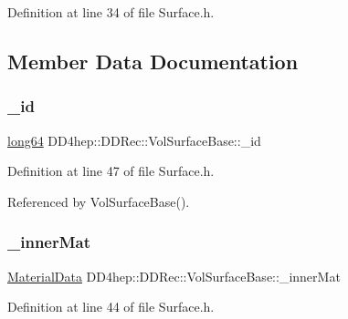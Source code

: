 Definition at line 34 of file Surface.\+h.



\subsection{Member Data Documentation}
\hypertarget{class_d_d4hep_1_1_d_d_rec_1_1_vol_surface_base_ab8b2a71397c0d4c0be2683aabb4e7882}{}\label{class_d_d4hep_1_1_d_d_rec_1_1_vol_surface_base_ab8b2a71397c0d4c0be2683aabb4e7882} 
\subsubsection{\texorpdfstring{\+\_\+id}{\_id}}
{\footnotesize\ttfamily \hyperlink{namespace_d_d_surfaces_ab6b3da366f31f80aec56447ac4442e78}{long64} D\+D4hep\+::\+D\+D\+Rec\+::\+Vol\+Surface\+Base\+::\+\_\+id\hspace{0.3cm}{\ttfamily [protected]}}



Definition at line 47 of file Surface.\+h.



Referenced by Vol\+Surface\+Base().

\hypertarget{class_d_d4hep_1_1_d_d_rec_1_1_vol_surface_base_abfa00728ddc6fc977fb9d297038448c2}{}\label{class_d_d4hep_1_1_d_d_rec_1_1_vol_surface_base_abfa00728ddc6fc977fb9d297038448c2} 
\subsubsection{\texorpdfstring{\+\_\+inner\+Mat}{\_innerMat}}
{\footnotesize\ttfamily \hyperlink{class_d_d4hep_1_1_d_d_rec_1_1_material_data}{Material\+Data} D\+D4hep\+::\+D\+D\+Rec\+::\+Vol\+Surface\+Base\+::\+\_\+inner\+Mat\hspace{0.3cm}{\ttfamily [protected]}}



Definition at line 44 of file Surface.\+h.



